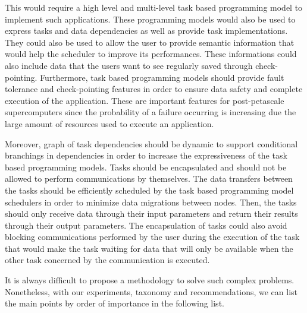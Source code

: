 This would require a high level and multi-level task based programming model to implement such applications.
These programming models would also be used to express tasks and data dependencies as well as provide task implementations.
They could also be used to allow the user to provide semantic information that would help the scheduler to improve its performances.
These informations could also include data that the users want to see regularly saved through check-pointing.
Furthermore, task based programming models should provide fault tolerance and check-pointing features in order to ensure data safety and complete execution of the application.
These are important features for post-petascale supercomputers since the probability of a failure occurring is increasing due the large amount of resources used to execute an application.

Moreover, graph of task dependencies should be dynamic to support conditional branchings in dependencies in order to increase the expressiveness of the task based programming models.
Tasks should be encapsulated and should not be allowed to perform communications by themselves.
The data transfers between the tasks should be efficiently scheduled by the task based programming model schedulers in order to minimize data migrations between nodes.
Then, the tasks should only receive data through their input parameters and return their results through their output parameters.
The encapsulation of tasks could also avoid blocking communications performed by the user during the execution of the task that would make the task waiting for data that will only be available when the other task concerned by the communication is executed.

It is always difficult to propose a methodology to solve such complex problems.
Nonetheless, with our experiments, taxonomy and recommendations, we can list the main points by order of importance in the following list.

